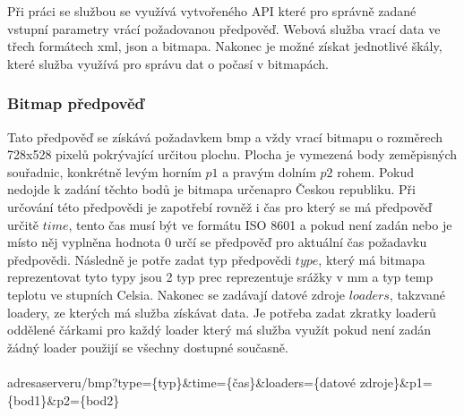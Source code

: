 \documentclass[czech,bachelor,dept460,male,csharp,cpdeclaration]{diploma}
\begin{document}
	Při práci se službou se využívá vytvořeného API které pro správně zadané vstupní parametry vrácí požadovanou předpověď. Webová služba vrací data ve třech formátech xml, json a bitmapa. Nakonec je možné získat jednotlivé škály, které služba využívá pro správu dat o počasí v bitmapách.
	
	\subsubsection{Bitmap předpověď}
	
	Tato předpověď se získává požadavkem bmp a vždy vrací bitmapu o rozměrech 728x528 pixelů pokrývající určitou plochu. Plocha je vymezená body zeměpisných souřadnic, konkrétně levým horním $p1$ a pravým dolním $p2$ rohem. Pokud nedojde k zadání těchto bodů je bitmapa určenapro Českou republiku. Při určování této předpovědi je zapotřebí rovněž i čas pro který se má předpověď určitě $time$, tento čas musí být ve formátu ISO 8601 a pokud není zadán nebo je místo něj vyplněna hodnota 0 určí se předpověď pro aktuální čas požadavku předpovědi. Následně je potře zadat typ předpovědi $type$, který má bitmapa reprezentovat tyto typy jsou 2 typ prec reprezentuje srážky v mm a typ temp teplotu ve stupních Celsia. Nakonec se zadávají datové zdroje $loaders$, takzvané loadery, ze kterých má služba získávat data. Je potřeba zadat zkratky loaderů oddělené čárkami pro každý loader který má služba využít pokud není zadán žádný loader použijí se všechny dostupné současně.
	\\\\
	adresaserveru/bmp?type=\{typ\}\&time=\{čas\}\&loaders=\{datové zdroje\}\&p1=\{bod1\}\&p2=\{bod2\}
	
\end{document}
